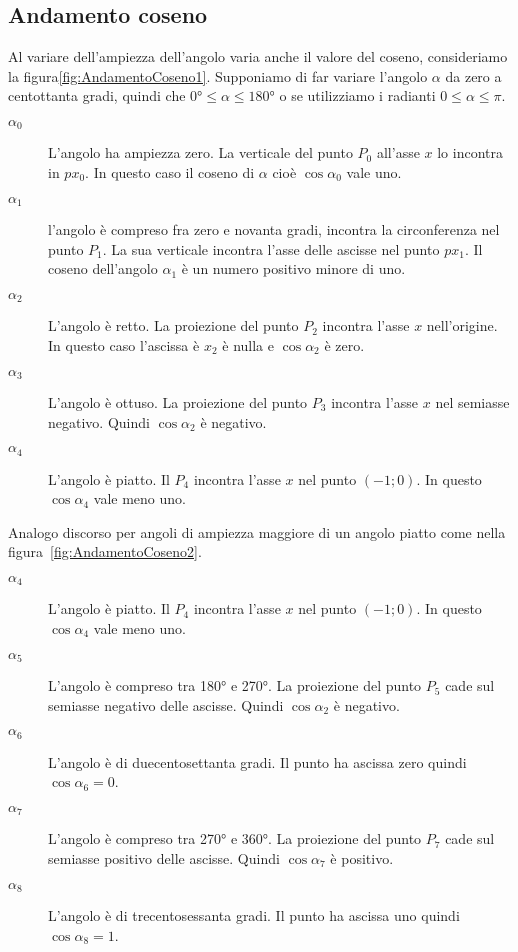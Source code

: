 \subsection{Andamento coseno}
\label{sec:andamentocoseno}
Al variare dell'ampiezza dell'angolo varia anche il valore del coseno, consideriamo la figura\nobs\vref{fig:AndamentoCoseno1}. Supponiamo di far variare l'angolo $\alpha$ da zero a centottanta gradi, quindi che $\ang{0}\leq\alpha\leq\ang{180}$ o se utilizziamo i radianti $0\leq\alpha\leq\pi$. 
\begin{description}
	\item[$\alpha_0$] L'angolo ha ampiezza zero. La verticale del punto $P_0$ all'asse $x$ lo incontra in $px_0$. In questo caso il coseno di $\alpha$ cioè $\cos\alpha_0$ vale uno.
	\item [$\alpha_1$] l'angolo è compreso fra zero e novanta gradi, incontra la circonferenza nel punto $P_1$. La sua verticale incontra l'asse delle ascisse nel punto $px_1$. Il coseno dell'angolo $\alpha_1$ è un numero positivo minore di uno.
	\item [$\alpha_2$] L'angolo  è retto. La proiezione del punto $P_2$ incontra l'asse $x$ nell'origine. In questo caso l'ascissa è $x_2$ è   nulla e $\cos\alpha_2$ è zero. 
	\item [$\alpha_3$]  L'angolo è ottuso. La proiezione del punto $P_3$ incontra  l'asse $x$ nel semiasse negativo. Quindi $\cos\alpha_2$ è negativo.
	\item [$\alpha_4$] L'angolo  è  piatto. Il  $P_4$ incontra l'asse $x$ nel punto $(-1;0)$. In questo  $\cos\alpha_4$ vale meno uno.
\end{description}
\begin{figure}
	\centering
	
	\label{fig:circonferenzagonimetricagonio}
\end{figure}
Analogo discorso per angoli di ampiezza  maggiore di un angolo  piatto come nella figura~\vref{fig:AndamentoCoseno2}.
\begin{description}
	\item [$\alpha_4$] L'angolo è piatto. Il  $P_4$ incontra l'asse $x$ nel punto $(-1;0)$. In questo  $\cos\alpha_4$ vale meno uno.
	\item [$\alpha_5$] L'angolo è compreso tra \ang{180} e \ang{270}. La proiezione del punto $P_5$ cade sul semiasse negativo delle ascisse. Quindi $\cos\alpha_2$ è negativo.
	\item [$\alpha_6$] L'angolo è di duecentosettanta gradi. Il punto ha ascissa zero quindi  $\cos\alpha_6=0$.
	\item [$\alpha_7$] L'angolo è compreso tra \ang{270} e \ang{360}. La proiezione del punto $P_7$ cade sul semiasse positivo delle ascisse. Quindi $\cos\alpha_7$ è positivo.
	\item [$\alpha_8$] L'angolo è di trecentosessanta gradi. Il punto ha ascissa uno quindi  $\cos\alpha_8=1$.
\end{description}
